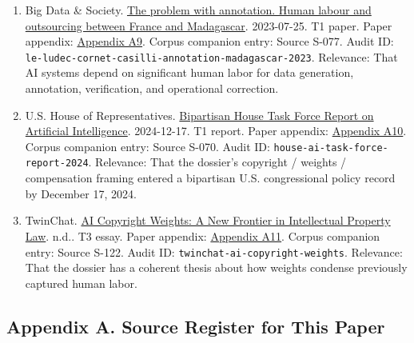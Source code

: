 \documentclass[
  american,
  11pt,
  letterpaper,
]{article}
\begin{document}
\begin{enumerate}
{  New York Times Company v. Microsoft Corporation et al, Opinion on
  Motions to Dismiss}. 2025-04-04. T1 court\_order. Paper appendix:
  \hyperref[appendix-a8-the-new-york-times-company-v-microsoft-corporation-et-al-opinion-on-motions-to-dismiss]{Appendix
  A8}. Corpus companion entry: Source S-085. Audit ID:
  \texttt{nyt-openai-motion-dismiss-order-2025}. Relevance: That another
  federal court outside the Anthropic case treated training-stage
  copying and dataset assembly as central issues serious enough to
  survive dismissal.
\item
  Big Data \& Society.
  \href{https://journals.sagepub.com/doi/10.1177/20539517231188723}{The
  problem with annotation. Human labour and outsourcing between France
  and Madagascar}. 2023-07-25. T1 paper. Paper appendix:
  \hyperref[appendix-a9-the-problem-with-annotation-human-labour-and-outsourcing-between-france-and-madagascar]{Appendix
  A9}. Corpus companion entry: Source S-077. Audit ID:
  \texttt{le-ludec-cornet-casilli-annotation-madagascar-2023}.
  Relevance: That AI systems depend on significant human labor for data
  generation, annotation, verification, and operational correction.
\item
  U.S. House of Representatives.
  \href{https://www.speaker.gov/wp-content/uploads/2024/12/AI-Task-Force-Report-FINAL.pdf}{Bipartisan
  House Task Force Report on Artificial Intelligence}. 2024-12-17. T1
  report. Paper appendix:
  \hyperref[appendix-a10-bipartisan-house-task-force-report-on-artificial-intelligence]{Appendix
  A10}. Corpus companion entry: Source S-070. Audit ID:
  \texttt{house-ai-task-force-report-2024}. Relevance: That the
  dossier's copyright / weights / compensation framing entered a
  bipartisan U.S. congressional policy record by December 17, 2024.
\item
  TwinChat.
  \href{https://medium.com/twinchat/ai-copyright-weights-a-new-frontier-in-intellectual-property-law-d8ee1b6c55ee}{AI
  Copyright Weights: A New Frontier in Intellectual Property Law}. n.d..
  T3 essay. Paper appendix:
  \hyperref[appendix-a11-ai-copyright-weights-a-new-frontier-in-intellectual-property-law]{Appendix
  A11}. Corpus companion entry: Source S-122. Audit ID:
  \texttt{twinchat-ai-copyright-weights}. Relevance: That the dossier
  has a coherent thesis about how weights condense previously captured
  human labor.
\end{enumerate}

\subsection{Appendix A. Source Register for This
Paper}\label{appendix-a.-source-register-for-this-paper}
\end{document}

